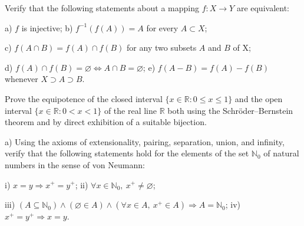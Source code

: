 \begin{exercise}
	Verify that the following statements about a mapping $f:X \to Y$ are equivalent:
	
	a) $f$ is injective; \qquad b) $f^{-1}(f(A))=A$ for every $A \subset X$;
	
	c) $f(A \cap B) = f(A) \cap f(B)$ for any two subsets $A$ and $B$ of X;
	
	d) $f(A) \cap f(B) = \varnothing \Leftrightarrow A \cap B = \varnothing$; \qquad e) $f(A-B) = f(A) - f(B)$ whenever $X \supset A \supset B$.
\end{exercise}

\begin{exercise}
	Prove the equipotence of the closed interval $\{x \in \mathbb{R} : 0 \leq x \leq 1\}$ and the open interval $\{x \in \mathbb{R} : 0 < x < 1\}$ of the real line $\mathbb{R}$ both using the Schröder–Bernstein theorem and by direct exhibition of a suitable bijection.
\end{exercise}

\begin{exercise}
	a) Using the axioms of extensionality, pairing, separation, union, and infinity, verify that the following statements hold for the elements of the set $\mathbb{N}_0$ of natural numbers in the sense of von Neumann: 
	
	i) $x=y \Rightarrow x^+ = y^+$; \qquad ii) $\forall x \in \mathbb{N}_0,~x^+ \neq \varnothing$;
	
	iii) $(A \subseteq \mathbb{N}_0) \wedge (\varnothing \in A) \wedge (\forall x \in A,~x^+ \in A) \Rightarrow A=\mathbb{N}_0$; \qquad iv) $x^+=y^+ \Rightarrow x=y$.
\end{exercise}

